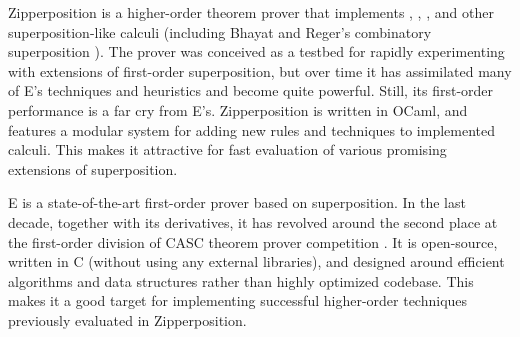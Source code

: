 Zipperposition is a higher-order theorem prover that implements \lfsup{},
\lsup{}, \osup{}, and other superposition-like calculi (including Bhayat and
Reger's combinatory superposition \cite{br-20-full-sup-w-combs}). The prover was
conceived as a testbed for rapidly experimenting with extensions of first-order
superposition, but over time it has assimilated many of E's techniques and
heuristics and become quite powerful. Still, its first-order performance is a
far cry from E's. Zipperposition is written in OCaml, and features a modular
system for adding new rules and techniques to implemented calculi.
This makes it attractive for fast evaluation of various promising extensions of
superposition.

 E is a state-of-the-art first-order prover based on superposition.
In the last decade, together with its derivatives, it has revolved around the
second place at the first-order division of CASC theorem prover
competition \cite{ss-96-casc}. It is open-source, written in C (without using any
external libraries), and designed around efficient algorithms and data structures
rather than highly optimized codebase. This makes it a good target for implementing
successful higher-order techniques previously evaluated in Zipperposition.



